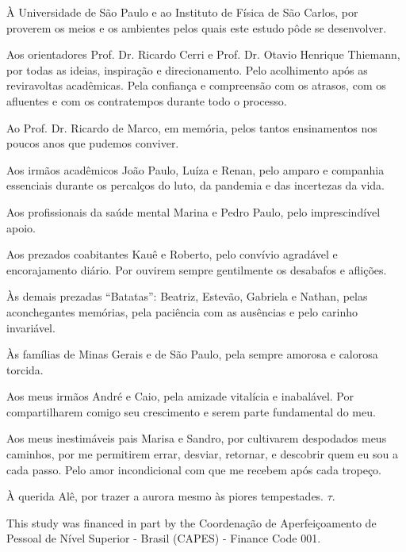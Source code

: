 \begin{agradecimentos}
À Universidade de São Paulo e ao Instituto de Física de São Carlos, por proverem os meios e os ambientes pelos quais este estudo pôde se desenvolver.

Aos orientadores Prof. Dr. Ricardo Cerri e Prof. Dr. Otavio Henrique Thiemann, por todas as ideias, inspiração e direcionamento. Pelo acolhimento após as reviravoltas acadêmicas. Pela confiança e compreensão com os atrasos, com os afluentes e com os contratempos durante todo o processo.

Ao Prof. Dr. Ricardo de Marco, em memória, pelos tantos ensinamentos nos poucos anos que pudemos conviver.

Aos irmãos acadêmicos João Paulo, Luíza e Renan, pelo amparo e companhia essenciais durante os percalços do luto, da pandemia e das incertezas da vida.

Aos profissionais da saúde mental Marina e Pedro Paulo, pelo imprescindível apoio.

Aos prezados coabitantes Kauê e Roberto, pelo convívio agradável e encorajamento diário.
Por ouvirem sempre gentilmente os desabafos e aflições.

Às demais prezadas ``Batatas'': Beatriz, Estevão, Gabriela e Nathan, pelas aconchegantes memórias, pela paciência com as ausências e pelo carinho invariável.

Às famílias de Minas Gerais e de São Paulo, pela sempre amorosa e calorosa torcida.

Aos meus irmãos André e Caio, pela amizade vitalícia e inabalável. Por compartilharem comigo seu crescimento e serem parte fundamental do meu.

%

%
%
%

Aos meus inestimáveis pais Marisa e Sandro, por cultivarem despodados meus caminhos, por me permitirem errar, desviar, retornar, e descobrir quem eu sou a cada passo. Pelo amor incondicional com que me recebem após cada tropeço.

À querida Alê, por trazer a aurora mesmo às piores tempestades. $\tau$.


\vfill

This study was financed in part by the Coordenação de Aperfeiçoamento de Pessoal de Nível Superior - Brasil (CAPES) - Finance Code 001.

\end{agradecimentos}
